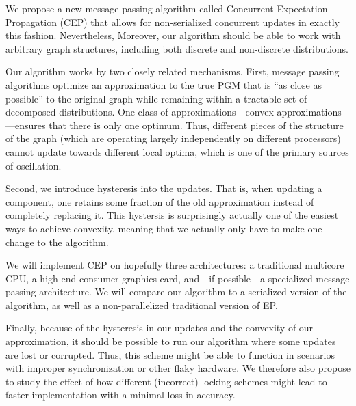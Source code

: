 \documentclass[12pt,leqno,twoside]{article}
\begin{document}
\begin{comment}
Consider a probability distribution over two binary variables $x_1$ and $x_2$
that have a distribution as in Figure 1. Suppose When updating sequentially,
the algorithm will converge quickly, with $x_1$ updating to the opposite of
$x_2$'s value. However, if the updates are performed in parallel, the 
system could potentially oscillate, never
\end{comment}

We propose a new message passing algorithm called Concurrent
Expectation Propagation (CEP) that allows for non-serialized
concurrent updates in exactly this fashion. Nevertheless,  Moreover,
our algorithm should be able to work with arbitrary graph structures,
including both discrete and non-discrete distributions.

Our algorithm works by two closely related mechanisms. First, message
passing algorithms optimize an approximation to the true PGM that
is ``as close as possible'' to the original graph while remaining
within a tractable set of decomposed distributions. One class of
approximations---convex approximations---ensures that there is
only one optimum. Thus, different pieces of the structure of the
graph (which are operating largely independently on different
processors) cannot update towards different local optima, which is
one of the primary sources of oscillation.

Second, we introduce hysteresis into the updates. That is, when
updating a component, one retains some fraction of the old approximation
instead of completely replacing it. This hystersis is surprisingly
actually one of the easiest ways to achieve convexity, meaning that
we actually only have to make one change to the algorithm.

We will implement CEP on hopefully three architectures: a traditional multicore
CPU, a high-end consumer graphics card, and---if possible---a
specialized message passing architecture. We will compare our
algorithm to a serialized version of the algorithm, as well as a
non-parallelized traditional version of EP.

Finally, because of the hysteresis in our updates and the convexity
of our approximation, it should be possible to run our algorithm
where some updates are lost or corrupted. Thus, this scheme might
be able to function in scenarios with improper synchronization or
other flaky hardware. We therefore also propose to study
the effect of how different (incorrect) locking schemes
might lead to faster implementation with a minimal loss in accuracy.
\end{document}
